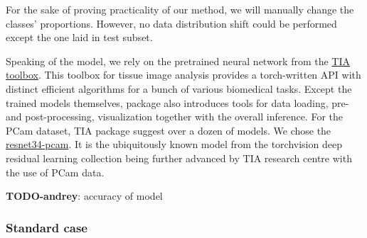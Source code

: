\documentclass{article}
\newcommand{\todo}[2]{{\color{red} {\bf TODO-#1}: #2}}
\begin{document}
For the sake of proving practicality of our method, we will manually change the classes' proportions. However, no data distribution shift could be performed except the one laid in test subset.

Speaking of the model, we rely on the pretrained neural network from the \href{https://tiatoolbox.readthedocs.io}{TIA toolbox}. This toolbox for tissue image analysis provides a torch-written API with distinct efficient algorithms for a bunch of various biomedical tasks. Except the trained models themselves, package also introduces tools for data loading, pre- and post-processing, visualization together with the overall inference. For the PCam dataset, TIA package suggest over a dozen of models. We chose the \href{https://huggingface.co/1aurent/resnet34.tiatoolbox-pcam}{resnet34-pcam}. It is the ubiquitously known model from the torchvision deep residual learning collection being further advanced by TIA research centre with the use of PCam data.

\todo{andrey}{accuracy of model}

\subsubsection{Standard case}
\end{document}
